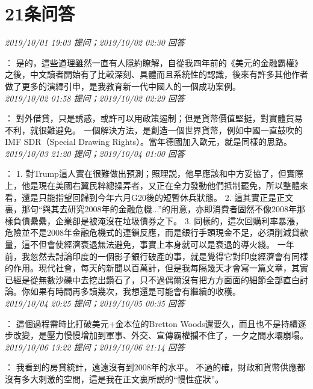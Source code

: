 \documentclass[twocolumn]{ctexart}
\begin{document}
\section{21条问答}

\textit{\hfill\noindent\small 2019/10/01 19:03 提问；2019/10/02 02:30 回答}

：
是的，這些道理雖然一直有人隱約瞭解，自從我四年前的《美元的金融霸權》之後，中文讀者開始有了比較深刻、具體而且系統性的認識，後來有許多其他作者做了更多的演繹引申，是我教育新一代中國人的一個成功案例。
\\

\textit{\hfill\noindent\small 2019/10/02 01:58 提问；2019/10/02 02:29 回答}

：
對外借貸，只是誘惑，或許可以用政策遏制；但是貨幣價值堅挺，對實體貿易不利，就很難避免。
一個解決方法，是創造一個世界貨幣，例如中國一直鼓吹的IMF SDR（Special Drawing Rights）。當年德國加入歐元，就是同樣的思路。
\\

\textit{\hfill\noindent\small 2019/10/03 21:20 提问；2019/10/04 01:00 回答}

：
1. 對Trump這人實在很難做出預測；照理説，他早應該和中方妥協了，但實際上，他是現在美國右翼民粹總操弄者，又正在全力發動他們抵制罷免，所以整體來看，還是只能指望回歸到今年六月G20後的短暫休兵狀態。 
2. 這其實正是正文裏，那句“與其去研究2008年的金融危機...”的用意，亦即消費者固然不像2008年那樣負債纍纍，企業卻是被淹沒在垃圾債券之下。 
3. 同樣的，這次回購利率暴漲，危險並不是2008年金融危機式的連鎖反應，而是銀行手頭現金不足，必須削減貸款量，這不但會使經濟衰退無法避免，事實上本身就可以是衰退的導火綫。 
一年前，我忽然去討論印度的一個影子銀行破產的事，就是覺得它對印度經濟會有同樣的作用。現代社會，每天的新聞以百萬計，但是我每隔幾天才會寫一篇文章，其實已經是從無數沙礫中去挖出鑽石了，只不過偶爾沒有把方方面面的細節全部直白討論。你如果有時間再多讀幾次，我想還是可能會有繼續的收穫。
\\

\textit{\hfill\noindent\small 2019/10/04 20:25 提问；2019/10/05 00:35 回答}

：
這個過程需時比打破美元+金本位的Bretton Woods還要久，而且也不是持續逐步改變，是壓力慢慢增加到軍事、外交、宣傳霸權攔不住了，一夕之間水壩崩塌。
\\

\textit{\hfill\noindent\small 2019/10/06 13:22 提问；2019/10/06 21:14 回答}

：
我看到的房貸統計，遠遠沒有到2008年的水平。
不過的確，財政和貨幣供應都沒有多大刺激的空間，這是我在正文裏所説的“慢性症狀”。
\\
\end{document}
